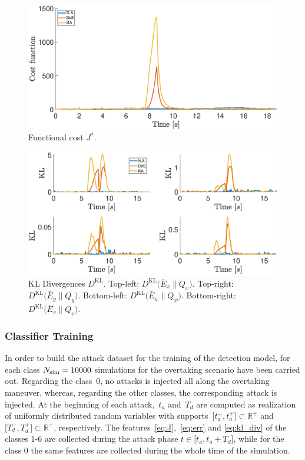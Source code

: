 \begin{figure}
	\centering
	\includegraphics[scale=0.4]{figure/Part2/Chapter6/Figures/J_All.eps}
	\caption{Functional cost $J^\ast$. } 
	\label{fig:gamma_J}
\end{figure}

\begin{figure}
	\centering
	\includegraphics[scale=0.4]{figure/Part2/Chapter6/Figures/KL_All.eps}
	\caption{KL Divergences $D^{\mathrm{KL}}$. Top-left: $D^{\mathrm{KL}}\big(\bar{E}_x \| Q_x\big)$. Top-right: $D^{\mathrm{KL}}\big(\bar{E}_y \| Q_y\big)$. Bottom-left: $D^{\mathrm{KL}}\big(\bar{E}_\psi \| Q_\psi\big)$. Bottom-right: $D^{\mathrm{KL}}\big(\bar{E}_v \| Q_v\big)$. } 
	\label{fig:gamma_KL}
\end{figure}

\subsubsection{Classifier Training}
In order to build the attack dataset for the training of the detection model, for each class $N_{\rm sim}=10000$ simulations for the overtaking scenario have been carried out. Regarding the class~$0$, no attacks is injected all along the overtaking maneuver, whereas, regarding the other classes, the corresponding attack is injected. At the beginning of each attack,~$t_a$ and~$T_d$ are computed as realization of uniformly distributed random variables with supports~$\big[t^-_a, t^+_a\big]\subset\mathbb R^+$ and~$\big[T^-_d, T^+_d\big]\subset\mathbb R^+$, respectively. The features~\eqref{eq:J},~\eqref{eq:err} and \eqref{eq:kl_div} of the classes $1$-$6$ are collected during the attack phase \mbox{$t \in \big[t_a,t_a+ T_d\big]$}, while for the class $0$ the same features are collected during the whole time of the simulation.



